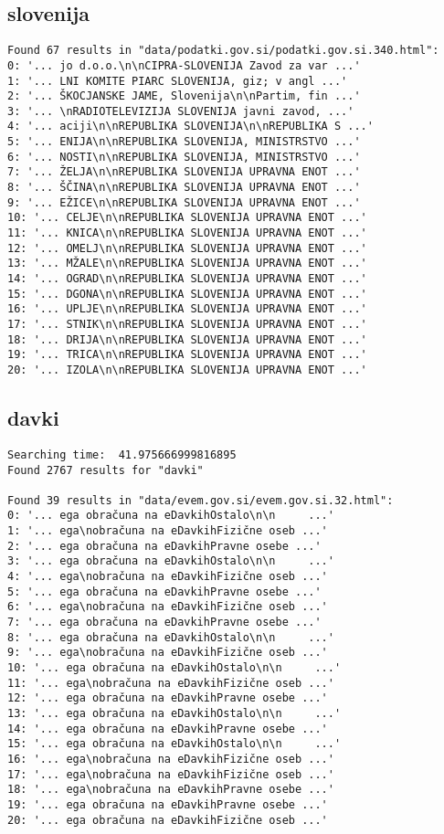 \documentclass[runningheads]{llncs}
\begin{document}
\subsection{slovenija}
\begin{lstlisting}
Found 67 results in "data/podatki.gov.si/podatki.gov.si.340.html":
0: '... jo d.o.o.\n\nCIPRA-SLOVENIJA Zavod za var ...'
1: '... LNI KOMITE PIARC SLOVENIJA, giz; v angl ...'
2: '... ŠKOCJANSKE JAME, Slovenija\n\nPartim, fin ...'
3: '... \nRADIOTELEVIZIJA SLOVENIJA javni zavod, ...'
4: '... aciji\n\nREPUBLIKA SLOVENIJA\n\nREPUBLIKA S ...'
5: '... ENIJA\n\nREPUBLIKA SLOVENIJA, MINISTRSTVO ...'
6: '... NOSTI\n\nREPUBLIKA SLOVENIJA, MINISTRSTVO ...'
7: '... ŽELJA\n\nREPUBLIKA SLOVENIJA UPRAVNA ENOT ...'
8: '... ŠČINA\n\nREPUBLIKA SLOVENIJA UPRAVNA ENOT ...'
9: '... EŽICE\n\nREPUBLIKA SLOVENIJA UPRAVNA ENOT ...'
10: '... CELJE\n\nREPUBLIKA SLOVENIJA UPRAVNA ENOT ...'
11: '... KNICA\n\nREPUBLIKA SLOVENIJA UPRAVNA ENOT ...'
12: '... OMELJ\n\nREPUBLIKA SLOVENIJA UPRAVNA ENOT ...'
13: '... MŽALE\n\nREPUBLIKA SLOVENIJA UPRAVNA ENOT ...'
14: '... OGRAD\n\nREPUBLIKA SLOVENIJA UPRAVNA ENOT ...'
15: '... DGONA\n\nREPUBLIKA SLOVENIJA UPRAVNA ENOT ...'
16: '... UPLJE\n\nREPUBLIKA SLOVENIJA UPRAVNA ENOT ...'
17: '... STNIK\n\nREPUBLIKA SLOVENIJA UPRAVNA ENOT ...'
18: '... DRIJA\n\nREPUBLIKA SLOVENIJA UPRAVNA ENOT ...'
19: '... TRICA\n\nREPUBLIKA SLOVENIJA UPRAVNA ENOT ...'
20: '... IZOLA\n\nREPUBLIKA SLOVENIJA UPRAVNA ENOT ...'
\end{lstlisting}

\subsection{davki}
\begin{lstlisting}
Searching time:  41.975666999816895
Found 2767 results for "davki"

Found 39 results in "data/evem.gov.si/evem.gov.si.32.html":
0: '... ega obračuna na eDavkihOstalo\n\n     ...'
1: '... ega\nobračuna na eDavkihFizične oseb ...'
2: '... ega obračuna na eDavkihPravne osebe ...'
3: '... ega obračuna na eDavkihOstalo\n\n     ...'
4: '... ega\nobračuna na eDavkihFizične oseb ...'
5: '... ega obračuna na eDavkihPravne osebe ...'
6: '... ega\nobračuna na eDavkihFizične oseb ...'
7: '... ega obračuna na eDavkihPravne osebe ...'
8: '... ega obračuna na eDavkihOstalo\n\n     ...'
9: '... ega\nobračuna na eDavkihFizične oseb ...'
10: '... ega obračuna na eDavkihOstalo\n\n     ...'
11: '... ega\nobračuna na eDavkihFizične oseb ...'
12: '... ega obračuna na eDavkihPravne osebe ...'
13: '... ega obračuna na eDavkihOstalo\n\n     ...'
14: '... ega obračuna na eDavkihPravne osebe ...'
15: '... ega obračuna na eDavkihOstalo\n\n     ...'
16: '... ega\nobračuna na eDavkihFizične oseb ...'
17: '... ega\nobračuna na eDavkihFizične oseb ...'
18: '... ega\nobračuna na eDavkihPravne osebe ...'
19: '... ega obračuna na eDavkihPravne osebe ...'
20: '... ega obračuna na eDavkihFizične oseb ...'
\end{lstlisting}
\end{document}
